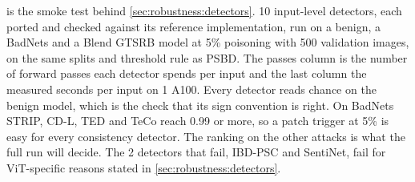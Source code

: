  is the smoke test behind \cref{sec:robustness:detectors}. 10 input-level detectors, each ported and checked against its reference implementation, run on a benign, a BadNets and a Blend GTSRB model at 5\% poisoning with 500 validation images, on the same splits and threshold rule as PSBD. The passes column is the number of forward passes each detector spends per input and the last column the measured seconds per input on 1 A100. Every detector reads chance on the benign model, which is the check that its sign convention is right. On BadNets STRIP, CD-L, TED and TeCo reach 0.99 or more, so a patch trigger at 5\% is easy for every consistency detector. The ranking on the other attacks is what the full run will decide. The 2 detectors that fail, IBD-PSC and SentiNet, fail for ViT-specific reasons stated in \cref{sec:robustness:detectors}.


